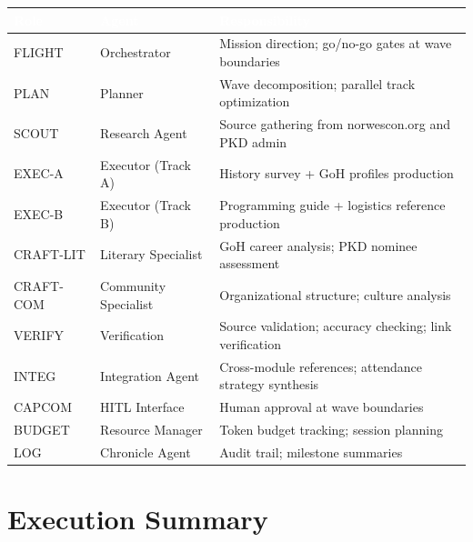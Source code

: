 \documentclass[11pt,letterpaper]{article}
\newcommand{\tableheader}[1]{\textbf{\sffamily\textcolor{white}{#1}}}
\begin{document}
\begin{center}
\begin{tabularx}{\textwidth}{L{2.5cm}L{2.5cm}X}
\toprule
{}
\tableheader{Role} & \tableheader{Agent} & \tableheader{Responsibility} \\
\midrule
FLIGHT & Orchestrator & Mission direction; go/no-go gates at wave boundaries \\
PLAN & Planner & Wave decomposition; parallel track optimization \\
SCOUT & Research Agent & Source gathering from norwescon.org and PKD admin \\
EXEC-A & Executor (Track A) & History survey + GoH profiles production \\
EXEC-B & Executor (Track B) & Programming guide + logistics reference production \\
CRAFT-LIT & Literary Specialist & GoH career analysis; PKD nominee assessment \\
CRAFT-COM & Community Specialist & Organizational structure; culture analysis \\
VERIFY & Verification & Source validation; accuracy checking; link verification \\
INTEG & Integration Agent & Cross-module references; attendance strategy synthesis \\
CAPCOM & HITL Interface & Human approval at wave boundaries \\
BUDGET & Resource Manager & Token budget tracking; session planning \\
LOG & Chronicle Agent & Audit trail; milestone summaries \\
\bottomrule
\end{tabularx}
\end{center}

\section{Execution Summary}
\end{document}
